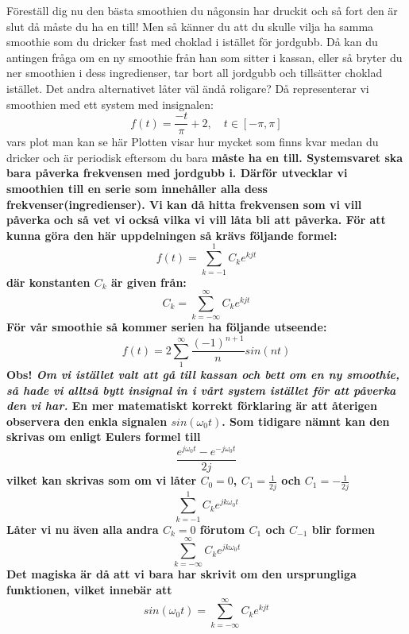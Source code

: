 \documentclass{article}
\begin{document}
Föreställ dig nu den bästa smoothien du någonsin har druckit och så fort den är slut då måste du ha en till! Men så känner du att du skulle vilja ha samma smoothie som du dricker fast med choklad i istället för jordgubb. Då kan du antingen fråga om en ny smoothie från han som sitter i kassan, eller så bryter du ner smoothien i dess ingredienser, tar bort all jordgubb och tillsätter choklad istället. Det andra alternativet låter väl ändå roligare? 
Då representerar vi smoothien med ett system med insignalen:
$$ f(t) = \frac{-t}{\pi} + 2, \quad t \in [-\pi,\pi] $$
vars plot man kan se här %
Plotten visar hur mycket som finns kvar medan du dricker och är periodisk eftersom du bara \bf{måste} ha en till. Systemsvaret ska bara påverka frekvensen med jordgubb i. Därför utvecklar vi smoothien till en serie som innehåller alla dess frekvenser(ingredienser). Vi kan då hitta frekvensen som vi vill påverka och så vet vi också vilka vi vill låta bli att påverka. För att kunna göra den här uppdelningen så krävs följande formel:
$$ f(t) = \sum_{k=-1}^1 C_k e^{k j t} $$ 
där konstanten $C_k$ är given från:
$$C_k = \sum_{k=-\infty}^{\infty} C_k e^{k j t}$$ %
För vår smoothie så kommer serien ha följande utseende:
$$f(t) = 2 \sum_{1}^{\infty} \frac{(-1)^{n+1}}{n} sin(n t) $$ 
Obs! \emph{Om vi istället valt att gå till kassan och bett om en ny smoothie, så hade vi alltså bytt insignal in i vårt system istället för att påverka den vi har.}
\newline
En mer matematiskt korrekt förklaring är att återigen observera den enkla signalen $sin(\omega_0 t)$. Som tidigare nämnt kan den skrivas om enligt Eulers formel till
$$ \frac{e^{j \omega_0 t} - e^{-j \omega_0 t}}{2j}$$
vilket kan skrivas som om vi låter $C_0=0$, $C_{1}=\frac{1}{2j}$ och $C_{1}=-\frac{1}{2j}$
$$ \sum_{k=-1}^1 C_k e^{j k \omega_0 t} $$
Låter vi nu även \bf{alla} andra $C_k = 0$ förutom  $C_1$ och $C_{-1}$ blir formen
$$ \sum_{k=-\infty}^{\infty} C_k e^{j k \omega_0 t} $$
Det magiska är då att vi bara har skrivit om den ursprungliga funktionen, vilket innebär att 
$$ sin(\omega_0 t) = \sum_{k=-\infty}^{\infty} C_k e^{k j t} $$
\end{document}
